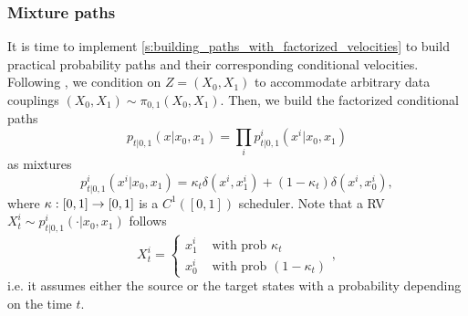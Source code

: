 \documentclass{fairmeta}
\numberwithin{equation}{section}
\begin{document}
\subsubsection{Mixture paths}
It is time to implement \cref{s:building_paths_with_factorized_velocities} to build practical probability paths and their corresponding conditional velocities.
Following \citet{gat2024discrete}, we condition on $Z=(X_0,X_1)$ to accommodate arbitrary data couplings $(X_0,X_1)\sim \pi_{0,1}(X_0,X_1)$.
Then, we build the factorized conditional paths
\begin{equation}
p_{t|0,1}(x|x_0,x_1) = \prod_i p^i_{t|0,1}(x^i|x_0,x_1)
\end{equation}
as mixtures 
\begin{equation}\label{e:mixture_cond}
    p^i_{t|0,1}(x^i|x_0,x_1) = \kappa_t\delta(x^i,x_1^i) + (1-\kappa_t) \delta(x^i,x_0^i),
\end{equation}
where $\kappa:[0,1]\rightarrow [0,1]$ is a $C^1([0,1])$ scheduler. Note that a RV $X_t^i\sim p^i_{t|0,1}(\cdot|x_0,x_1)$ follows
\begin{equation}
    X_t^i = \begin{cases}
        x_1^i & \text{ with prob }\kappa_t \\
        x_0^i & \text{ with prob } (1-\kappa_t)
    \end{cases},
\end{equation}
i.e. it assumes either the source or the target states with a probability depending on the time $t$.
\end{document}
